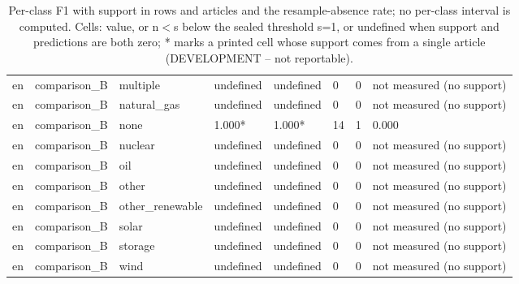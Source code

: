 \begin{table}[htbp]
\begin{tabular}{llllllll}
en & comparison\_B & multiple & undefined & undefined & 0 & 0 & not measured (no support) \\
en & comparison\_B & natural\_gas & undefined & undefined & 0 & 0 & not measured (no support) \\
en & comparison\_B & none & 1.000* & 1.000* & 14 & 1 & 0.000 \\
en & comparison\_B & nuclear & undefined & undefined & 0 & 0 & not measured (no support) \\
en & comparison\_B & oil & undefined & undefined & 0 & 0 & not measured (no support) \\
en & comparison\_B & other & undefined & undefined & 0 & 0 & not measured (no support) \\
en & comparison\_B & other\_renewable & undefined & undefined & 0 & 0 & not measured (no support) \\
en & comparison\_B & solar & undefined & undefined & 0 & 0 & not measured (no support) \\
en & comparison\_B & storage & undefined & undefined & 0 & 0 & not measured (no support) \\
en & comparison\_B & wind & undefined & undefined & 0 & 0 & not measured (no support) \\
\bottomrule
\end{tabular}
\caption{Per-class F1 with support in rows and articles and the resample-absence rate; no per-class interval is computed. Cells: value, or n$<$s below the sealed threshold s=1, or undefined when support and predictions are both zero; * marks a printed cell whose support comes from a single article (DEVELOPMENT -- not reportable).}
\end{table}
